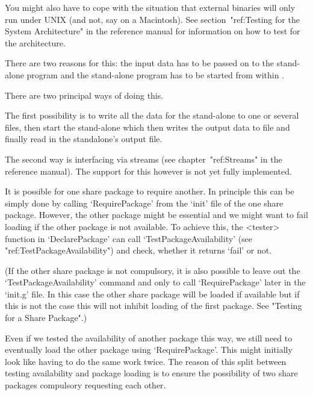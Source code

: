 You might also have to cope with the situation that external binaries will
only run under UNIX (and not, say on a Macintosh). See section~"ref:Testing
for the System Architecture" in the reference manual for information on how
to test for the architecture.


There are two reasons for this: the input data has  to be passed on to
the stand-alone program and the  stand-alone program  has to be  started
from within {\GAP}.

There are two principal ways of doing this.  

The first possibility is to write  all the data  for the stand-alone to
one or several files, then start the stand-alone  which then writes the
output data to file and finally read in the standalone's output file.

The second way is interfacing via streams (see chapter~"ref:Streams" in the
reference manual). The support for this however is not yet fully implemented.


It is possible for one share package to require another. In principle this
can be simply done by calling `RequirePackage' from the `init' file of the
one share package. However, the other package might be essential and we
might want to fail loading if the other package is not available. To achieve
this,  the <tester> function in `DeclarePackage' can call
`TestPackageAvailability'  (see "ref:TestPackageAvailability") and check,
whether it returns `fail' or not.

(If the other share package is not compulsory, it is also possible to leave
out the `TestPackageAvailability' command and only to call `RequirePackage'
later in the `init.g' file. In this case the other share package will be
loaded if available but if this is not the case this will not inhibit
loading of the first package. See "Testing for a Share Package".)

Even if we tested the availability of another package this way, we
still  need to eventually load the other package using
`RequirePackage'. This might initially look like having to do the same
work twice. The reason of this split between testing availability and
package loading is to ensure the possibility of two share packages
compulsory requesting each other.

